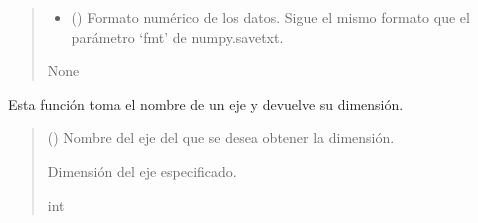 \documentclass[letterpaper,10pt,english]{sphinxmanual}
\begin{document}
\begin{fulllineitems}
\begin{fulllineitems}
\begin{quote}
\begin{description}
\begin{itemize}
\item {} 
\sphinxAtStartPar
{} (\sphinxstyleliteralemphasis{\sphinxupquote{, }}) \textendash{} Formato numérico de los datos. Sigue el mismo formato que el parámetro ‘fmt’
de numpy.savetxt.

\end{itemize}

\sphinxAtStartPar
None

\end{description}\end{quote}

\end{fulllineitems}


\begin{fulllineitems}
\label{\detokenize{myutils:myutils.tensor.Tensor.size}}
\pysigstartsignatures
{}
\pysigstopsignatures
\sphinxAtStartPar
Esta función toma el nombre de un eje y devuelve su dimensión.
\begin{quote}\begin{description}
\sphinxAtStartPar
{} () \textendash{} Nombre del eje del que se desea obtener la dimensión.

\sphinxAtStartPar
Dimensión del eje especificado.

\sphinxAtStartPar
int

\end{description}\end{quote}

\end{fulllineitems}



\end{fulllineitems}
\end{document}
